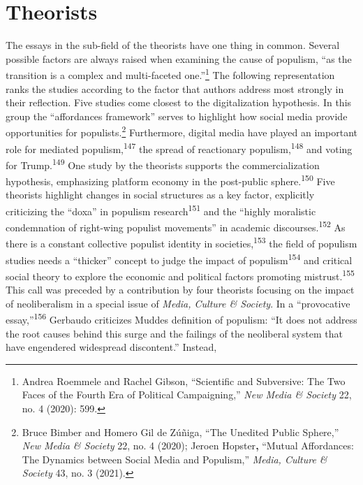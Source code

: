 \documentclass{tufte-handout}
\begin{document}
{{\hypertarget{theorists}{%
\section{Theorists}\label{theorists}}

The essays in the sub-field of the theorists have one thing in common.
Several possible factors are always raised when examining the cause of
populism, ``as the transition is a complex and multi-faceted
one.''\footnote{Andrea Roemmele and Rachel Gibson, ``Scientific and
  Subversive: The Two Faces of the Fourth Era of Political
  Campaigning,'' \emph{New Media \& Society} 22, no. 4 (2020): 599.} The
following representation ranks the studies according to the factor that
authors address most strongly in their reflection. Five studies come
closest to the digitalization hypothesis. In this group the
``affordances framework'' serves to highlight how social media provide
opportunities for populists.\footnote{Bruce Bimber and Homero Gil de
  Zúñiga, ``The Unedited Public Sphere,'' \emph{New Media \& Society}
  22, no. 4 (2020); Jeroen Hopster\textbf{,} ``Mutual Affordances: The
  Dynamics between Social Media and Populism,'' \emph{Media, Culture \&
  Society} 43, no. 3 (2021).} Furthermore, digital media have played an
important role for mediated populism,\textsuperscript{147} the spread of reactionary
populism,\textsuperscript{148} and voting for
Trump.\textsuperscript{149}
One study by the theorists supports the commercialization hypothesis,
emphasizing platform economy in the post-public sphere.\textsuperscript{150} Five theorists highlight changes in
social structures as a key factor, explicitly criticizing the ``doxa''
in populism research\textsuperscript{151}
and the ``highly moralistic condemnation of right-wing populist
movements'' in academic discourses.\textsuperscript{152} As there is a constant collective
populist identity in societies,\textsuperscript{153} the field of populism
studies needs a ``thicker'' concept to judge the impact of
populism\textsuperscript{154} and critical social
theory to explore the economic and political factors promoting
mistrust.\textsuperscript{155} This call was
preceded by a contribution by four theorists focusing on the impact of
neoliberalism in a special issue of \emph{Media, Culture \& Society}. In
a ``provocative essay,''\textsuperscript{156} Gerbaudo
criticizes Mudde\textquotesingle s definition of populism: ``It does not
address the root causes behind this surge and the failings of the
neoliberal system that have engendered widespread discontent.'' Instead,
}}
\end{document}
